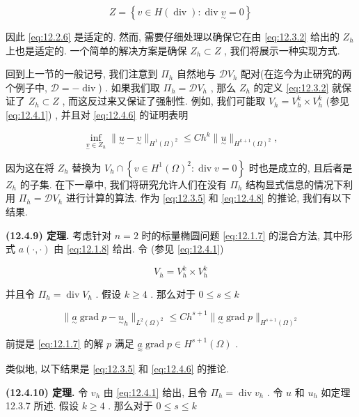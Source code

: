 $$
Z = \left\{ v \in H(\operatorname{div}) : \operatorname{div}\underset{\sim}{v} = 0 \right\}
$$

因此 \eqref{eq:12.2.6} 是适定的. 然而, 需要仔细处理以确保它在由 \eqref{eq:12.3.2} 给出的 $Z_{h}$ 上也是适定的. 一个简单的解决方案是确保 $Z_{h} \subset Z$ , 我们将展示一种实现方式.

回到上一节的一般记号, 我们注意到 $\varPi_{h}$ 自然地与 $\mathcal{D}V_{h}$ 配对(在迄今为止研究的两个例子中, $\mathcal{D} = -\operatorname{div}$) . 如果我们取 $\varPi_{h} = \mathcal{D}V_{h}$ , 那么 $Z_{h}$ 的定义 \eqref{eq:12.3.2} 就保证了 $Z_{h} \subset Z$ , 而这反过来又保证了强制性. 例如, 我们可能取 $V_{h} = V_{h}^{k} \times V_{h}^{k}$ (参见 \eqref{eq:12.4.1}) , 并且对 \eqref{eq:12.4.6} 的证明表明

\begin{equation}\label{eq:12.4.8}
\inf_{\underset{\sim}{v} \in Z_{h}} \|\underset{\sim}{u} - \underset{\sim}{v}\|_{H^{1}(\Omega)^{2}} \leq C h^{k} \|\underset{\sim}{u}\|_{H^{k + 1}(\Omega)^{2}},
\end{equation}

因为这在将 $Z_{h}$ 替换为 $V_{h} \cap \left\{ v \in H^{1}(\Omega)^{2} : \operatorname{div}v = 0 \right\}$ 时也是成立的, 且后者是 $Z_{h}$ 的子集. 在下一章中, 我们将研究允许人们在没有 $\varPi_{h}$ 结构显式信息的情况下利用 $\varPi_{h} = \mathcal{D}V_{h}$ 进行计算的算法. 作为 \eqref{eq:12.3.5} 和 \eqref{eq:12.4.8} 的推论, 我们有以下结果.

\textbf{(12.4.9) 定理.} 考虑针对 $n = 2$ 时的标量椭圆问题 \eqref{eq:12.1.7} 的混合方法, 其中形式 $a(\cdot, \cdot)$ 由 \eqref{eq:12.1.8} 给出. 令 (参见 \eqref{eq:12.4.1})

$$
V_{h} = V_{h}^{k} \times V_{h}^{k}
$$

并且令 $\varPi_{h} = \operatorname{div}V_{h}$ . 假设 $k \geq 4$ . 那么对于 $0 \leq s \leq k$ 

$$
\|\underset{\sim}{a} \operatorname{grad}p - \underset{\sim}{u}_{h}\|_{L^{2}(\Omega)^{2}} \leq C h^{s + 1} \|\underset{\sim}{a} \operatorname{grad}p\|_{H^{s + 1}(\Omega)^{2}}
$$

前提是 \eqref{eq:12.1.7} 的解 $p$ 满足 $\underset{\approx}{a} \operatorname{grad}p \in H^{s + 1}(\Omega)$ .

类似地, 以下结果是 \eqref{eq:12.3.5} 和 \eqref{eq:12.4.6} 的推论.

\textbf{(12.4.10) 定理.} 令 $v_{h}$ 由 \eqref{eq:12.4.1} 给出, 且令 $\varPi_{h} = \operatorname{div}v_{h}$ . 令 $u$ 和 $u_{h}$ 如定理 12.3.7 所述. 假设 $k \geq 4$ . 那么对于 $0 \leq s \leq k$ 

